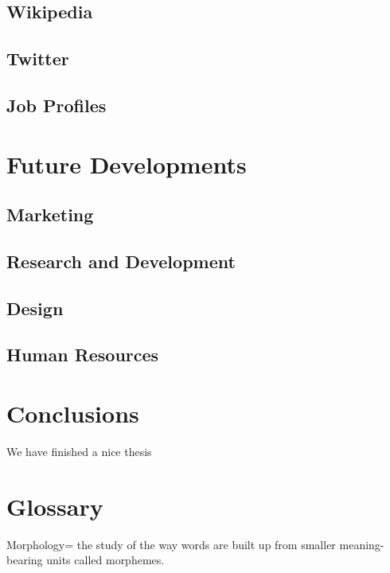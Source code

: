 \documentclass[]{book}
\begin{document}
\section{Wikipedia}\label{wikipedia-1}

\section{Twitter}\label{twitter-1}

\section{Job Profiles}\label{job-profiles-1}

\chapter{Future Developments}\label{future-developments}

\section{Marketing}\label{marketing}

\section{Research and Development}\label{research-and-development}

\section{Design}\label{design}

\section{Human Resources}\label{human-resources}

\chapter{Conclusions}\label{conclusions}

We have finished a nice thesis

\chapter{Glossary}\label{glossary}

Morphology= the study of the way words are built up from smaller
meaning-bearing units called morphemes.


\end{document}
